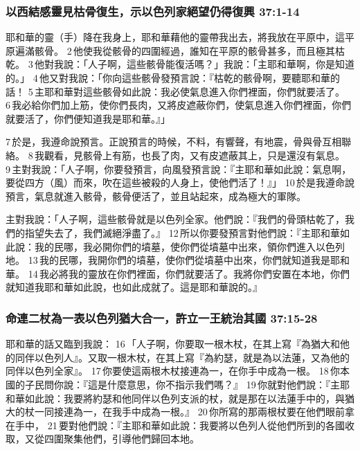 \subsubsection{以西結感靈見枯骨復生，示以色列家絕望仍得復興 37:1-14}
耶和華的靈（手）降在我身上，耶和華藉他的靈帶我出去，將我放在平原中，這平原遍滿骸骨。 2 他使我從骸骨的四圍經過，誰知在平原的骸骨甚多，而且極其枯乾。 3 他對我說：「人子啊，這些骸骨能復活嗎？」我說：「主耶和華啊，你是知道的。」 4 他又對我說：「你向這些骸骨發預言說：『枯乾的骸骨啊，要聽耶和華的話！ 5 主耶和華對這些骸骨如此說：我必使氣息進入你們裡面，你們就要活了。 6 我必給你們加上筋，使你們長肉，又將皮遮蔽你們，使氣息進入你們裡面，你們就要活了，你們便知道我是耶和華。』」

7 於是，我遵命說預言。正說預言的時候，不料，有響聲，有地震，骨與骨互相聯絡。 8 我觀看，見骸骨上有筋，也長了肉，又有皮遮蔽其上，只是還沒有氣息。 9 主對我說：「人子啊，你要發預言，向風發預言說：『主耶和華如此說：氣息啊，要從四方（風）而來，吹在這些被殺的人身上，使他們活了！』」 10 於是我遵命說預言，氣息就進入骸骨，骸骨便活了，並且站起來，成為極大的軍隊。


主對我說：「人子啊，這些骸骨就是以色列全家。他們說：『我們的骨頭枯乾了，我們的指望失去了，我們滅絕淨盡了。』 12 所以你要發預言對他們說：『主耶和華如此說：我的民哪，我必開你們的墳墓，使你們從墳墓中出來，領你們進入以色列地。 13 我的民哪，我開你們的墳墓，使你們從墳墓中出來，你們就知道我是耶和華。 14 我必將我的靈放在你們裡面，你們就要活了。我將你們安置在本地，你們就知道我耶和華如此說，也如此成就了。這是耶和華說的。』

\subsubsection{命連二杖為一表以色列猶大合一，許立一王統治其國 37:15-28}
耶和華的話又臨到我說： 16 「人子啊，你要取一根木杖，在其上寫『為猶大和他的同伴以色列人』。又取一根木杖，在其上寫『為約瑟，就是為以法蓮，又為他的同伴以色列全家』。 17 你要使這兩根木杖接連為一，在你手中成為一根。 18 你本國的子民問你說：『這是什麼意思，你不指示我們嗎？』 19 你就對他們說：『主耶和華如此說：我要將約瑟和他同伴以色列支派的杖，就是那在以法蓮手中的，與猶大的杖一同接連為一，在我手中成為一根。』 20 你所寫的那兩根杖要在他們眼前拿在手中， 21 要對他們說：『主耶和華如此說：我要將以色列人從他們所到的各國收取，又從四圍聚集他們，引導他們歸回本地。

